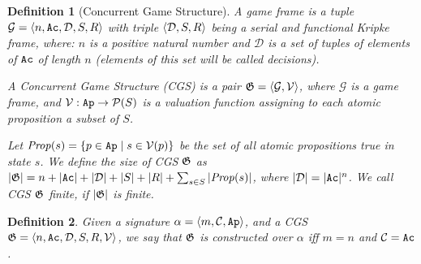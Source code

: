 \documentclass{article}
\newtheorem{definition}{Definition}
\begin{document}
\begin{definition}[Concurrent Game Structure]
    A \emph{game frame} is a tuple $\mathcal{G}=\langle n,\texttt{Ac}, \mathcal{D}, S,R  \rangle$ with triple $\langle \mathcal{D}, S, R \rangle$ being a serial and functional Kripke frame, where:  $n$ is a positive natural number and  $\mathcal{D}$ is a set of tuples of elements of $\texttt{Ac}$ of length $n$ (elements of this set will be called \emph{decisions}).  %
      
    A \emph{Concurrent Game Structure} (CGS) is a pair $\mathfrak{G}=\langle \mathcal{G},\mathcal{V} \rangle$, where $\mathcal{G}$ is a game frame, and $\mathcal{V}: \texttt{Ap} \to \mathcal{P}(S)$ is a \emph{valuation function} assigning to each atomic proposition a subset of $S$. %

    Let $\mathit{Prop} (s) = \{p \in \texttt{Ap} \mid s \in \mathcal{V}(p)\}$ be the set of all atomic propositions true in state $s$. We define the \emph{size of CGS} $\mathfrak{G}$ as $|\mathfrak{G}| = n + |\texttt{Ac}| + |\mathcal{D}| + |S| + |R| + \sum_{s \in S} |\mathit{Prop} (s)|$, where $|\mathcal{D}| = |\texttt{Ac}|^n$. We call CGS $\mathfrak{G}$ \emph{finite}, if $|\mathfrak{G}|$ is finite.
\end{definition}




    
     
 




\begin{definition}
    Given a signature $\alpha=\langle m,\mathcal{C},\texttt{Ap} \rangle$,  and  a CGS $\mathfrak{G}=\langle n,\texttt{Ac},\mathcal{D},S,R,\mathcal{V} \rangle$, we say that $\mathfrak{G}$ is constructed over $\alpha$ iff  $m=n$ and $\mathcal{C}=\texttt{Ac}$. 
 \end{definition}
\end{document}
